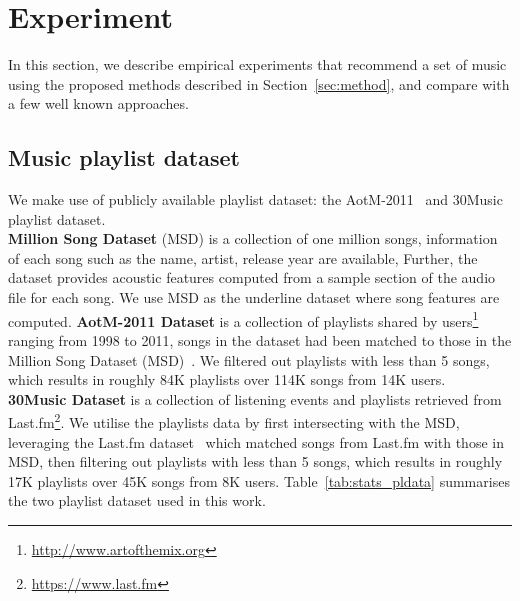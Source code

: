 \section{Experiment}
\label{sec:experiment}

In this section, we describe empirical experiments that recommend a set of music using the proposed methods
described in Section~\ref{sec:method}, and compare with a few well known approaches.

\subsection{Music playlist dataset}
We make use of publicly available playlist dataset: the AotM-2011~\cite{mcfee2012hypergraph} and 30Music~\cite{30music2015} playlist dataset. \\
%
{\bf Million Song Dataset} (MSD) is a collection of one million songs, information of each song such as the name, artist, release year are available,
Further, the dataset provides acoustic features computed from a sample section of the audio file for each song. %
We use MSD as the underline dataset where song features are computed.
%
{\bf AotM-2011 Dataset} is a collection of playlists shared by users\footnote{\url{http://www.artofthemix.org}} ranging from 1998 to 2011, 
songs in the dataset had been matched to those in the Million Song Dataset (MSD)~\cite{msd2011}.
We filtered out playlists with less than 5 songs, which results in roughly 84K playlists over 114K songs from 14K users. \\
%
{\bf 30Music Dataset} is a collection of listening events and playlists retrieved from Last.fm\footnote{\url{https://www.last.fm}}.
We utilise the playlists data by first intersecting with the MSD, leveraging the Last.fm dataset~\cite{lastfmdataset} 
which matched songs from Last.fm with those in MSD, then filtering out playlists with less than 5 songs, 
which results in roughly 17K playlists over 45K songs from 8K users.
Table~\ref{tab:stats_pldata} summarises the two playlist dataset used in this work.
%
\begin{table}[!h]
\centering
\caption{Statistics of music playlist dataset}
\label{tab:stats_pldata}
\end{table}



